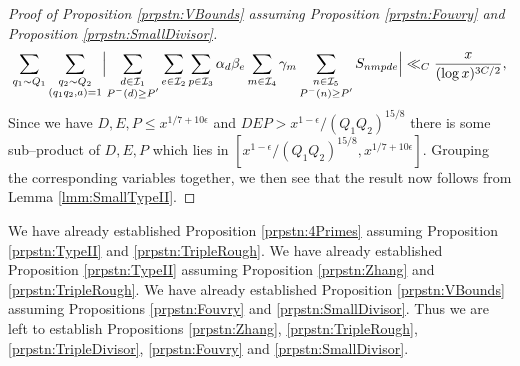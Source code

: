 \documentclass[10pt]{amsart}
\theoremstyle{plain}
\numberwithin{equation}{section}
\begin{document}
\begin{proof}[Proof of Proposition \ref{prpstn:VBounds} assuming Proposition \ref{prpstn:Fouvry} and Proposition \ref{prpstn:SmallDivisor}]
\[
\sum_{q_1\sim Q_1}\sum_{\substack{ q_2\sim Q_2\\ (q_1q_2,a)=1}}\Bigl|\sum_{\substack{d\in \mathcal{I}_1\\ P^-(d)\ge P'}}\sum_{e\in\mathcal{I}_2}\sum_{p\in\mathcal{I}_3}\alpha_{d}\beta_e\sum_{m\in\mathcal{I}_4}\gamma_m \sum_{\substack{n\in \mathcal{I}_5\\ P^-(n)\ge P'}}S_{n m p d e}\Bigr|\ll_C \frac{x}{(\log{x})^{3C/2}},
\]
Since we have $D,E,P\le x^{1/7+10\epsilon}$ and $D E P>x^{1-\epsilon}/(Q_1Q_2)^{15/8}$ there is some sub--product of $D,E,P$ which lies in $[x^{1-\epsilon}/(Q_1Q_2)^{15/8},x^{1/7+10\epsilon}]$. Grouping the corresponding variables together, we then see that the result now follows from Lemma \ref{lmm:SmallTypeII}.
\end{proof}
We have already established  Proposition \ref{prpstn:4Primes} assuming Proposition \ref{prpstn:TypeII} and \ref{prpstn:TripleRough}. We have already established Proposition \ref{prpstn:TypeII} assuming Proposition \ref{prpstn:Zhang} and \ref{prpstn:TripleRough}. We have already established Proposition \ref{prpstn:VBounds} assuming Propositions \ref{prpstn:Fouvry} and \ref{prpstn:SmallDivisor}. Thus we are left to establish Propositions \ref{prpstn:Zhang}, \ref{prpstn:TripleRough}, \ref{prpstn:TripleDivisor}, \ref{prpstn:Fouvry} and \ref{prpstn:SmallDivisor}.
%
%
%
%
%
%
%
%
%
%
%
%
%
%
%
%
%
%
%
\end{document}
